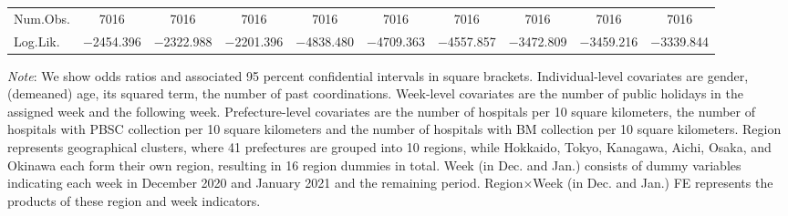 \documentclass[12pt, a4paper]{article}
\begin{document}
\begin{landscape}
\begin{table}[H]
\begin{threeparttable}
\begin{tabular}[t]{lccccccccc}
Num.Obs. & \num{7016} & \num{7016} & \num{7016} & \num{7016} & \num{7016} & \num{7016} & \num{7016} & \num{7016} & \num{7016}\\
Log.Lik. & \num{-2454.396} & \num{-2322.988} & \num{-2201.396} & \num{-4838.480} & \num{-4709.363} & \num{-4557.857} & \num{-3472.809} & \num{-3459.216} & \num{-3339.844}\\
\bottomrule
\end{tabular}
\begin{tablenotes}
\item \emph{Note}: We show odds ratios and associated 95 percent confidential intervals in square brackets. Individual-level covariates are gender, (demeaned) age, its squared term, the number of past coordinations. Week-level covariates are the number of public holidays in the assigned week and the following week. Prefecture-level covariates are the number of hospitals per 10 square kilometers, the number of hospitals with PBSC collection per 10 square kilometers and the number of hospitals with BM collection per 10 square kilometers. Region represents geographical clusters, where 41 prefectures are grouped into 10 regions, while Hokkaido, Tokyo, Kanagawa, Aichi, Osaka, and Okinawa each form their own region, resulting in 16 region dummies in total. Week (in Dec. and Jan.) consists of dummy variables indicating each week in December 2020 and January 2021 and the remaining period. Region$\times$Week (in Dec. and Jan.) FE represents the products of these region and week indicators.
\end{tablenotes}
\end{threeparttable}
\end{table}
\end{landscape}
\end{document}
